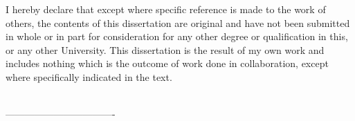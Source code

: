
\begin{declaration}

I hereby declare that except where specific reference is made to the work of others, the contents of this dissertation are original and have not been submitted in whole or in part for consideration for any other degree or qualification in this, or any other University. This dissertation is the result of my own work and includes nothing which is the outcome of work done in collaboration, except where specifically indicated in the text. 
\\
\\

 \begin{flushright}
 ----------------------------------
 \end{flushright}



\end{declaration}

